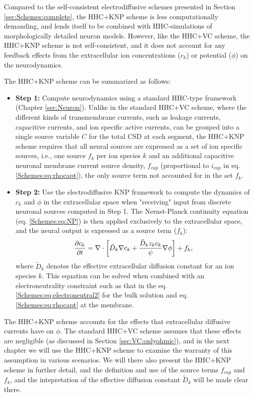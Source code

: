 Compared to the self-consistent electrodiffusive schemes presented in Section \ref{sec:Schemes:complete}, the HHC+KNP scheme is less computationally demanding, and lends itself to be combined with HHC-simulations of morphologically detailed neuron models. However, like the HHC+VC scheme, the HHC+KNP scheme is not self-consistent, and it does not account for any feedback effects from the extracellular ion concentrations ($c_k$) or potential ($\phi$) on the neurodynamics.

The HHC+KNP scheme can be summarized as follows:

\begin{itemize}
\item {\bf Step 1:} Compute neurodynamics using a standard HHC-type framework (Chapter \ref{sec:Neuron}). Unlike in the standard HHC+VC scheme, where the different kinds of transmembrane currents, such as leakage currents, capacitive currents, and ion specific active currents, can be grouped into a single source variable $C$ for the total CSD at each segment, the HHC+KNP scheme requires that all neural sources are expressed as a set of ion specific sources, i.e., one source $f_k$ per ion species $k$ and an additional capacitive neuronal membrane current source density, $f_{cap}$ (proportional to $i_{cap}$ in eq. \ref{Schemes:eq:rhocapt}), the only source term not accounted for in the set $f_k$.

\item {\bf Step 2:} Use the electrodiffusive KNP framework to compute the dynamics of $c_k$ and $\phi$ in the extracellular space when "receiving" input from discrete neuronal sources computed in Step 1. The Nernst-Planck continuity equation (eq. \ref{Schemes:eq:NP}) is then applied exclusively to the extracellular space, and the neural output is expressed as a source term ($f_k$):
\begin{equation}
\frac{\partial c_k}{\partial t} = {\bf \nabla} \cdot \left[ \tilde{D}_k {\bf \nabla} c_k + \frac{\tilde{D}_k z_k c_k}{\psi} {\bf \nabla} \phi \right] + f_k, 
\label{Schemes:eq:NPe}
\end{equation}
where $\tilde{D}_k$ denotes the effective extracellular diffusion constant for an ion species $k$. This equation can be solved when combined with an electroneutrality constraint such as that in the 
eq. \ref{Schemes:eq:electroneutral2} for the bulk solution and eq. \ref{Schemes:eq:rhocapt} at the membrane. 
\end{itemize}

The HHC+KNP scheme accounts for the effects that extracellular diffusive currents have on $\phi$.
The standard HHC+VC scheme assumes that these effects are negligible (as discussed in Section \ref{sec:VC:onlyohmic}), and in the next chapter we will use the HHC+KNP scheme to examine the warranty of this assumption in various scenarios. We will there also present the HHC+KNP scheme in further detail, and the definition and use of the source terms  $f_{cap}$ and  $f_k$, and the intepretation of the effective diffusion constant $\tilde{D}_k$ will be made clear there. 

